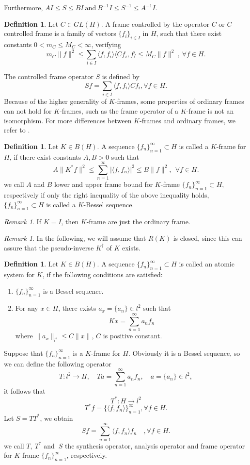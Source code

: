 \documentclass[11pt]{amsart}
\theoremstyle{definition}
\newtheorem{defn}[thm]{Definition}
\theoremstyle{remark}
\newtheorem{rem}[thm]{Remark}
\numberwithin{equation}{section}
\begin{document}
Furthermore, $AI\le S\le BI\ \text{and}\ B^{-1}I\le S^{-1}\le A^{-1}I$.
\begin{defn}
Let $C\in GL(H)$. A frame controlled by the operator $C$ or $C$-controlled frame is a family of vectors $\{f_i\}_{i\in I}$ in $H$, such that there exist constants $0<m_C\le M_C<\infty$, verifying
\[m_C\|f\|^2\le\sum_{i\in I}\langle f,f_i\rangle\langle Cf_i,f\rangle\le M_C\|f\|^2\ ,\ \forall f\in H.\]
\end{defn}
The controlled frame operator $S$ is defined by
\[Sf=\sum_{i\in I}\langle f,f_i\rangle Cf_i, \forall f\in H.\]
Because of the higher generality of $K$-frames, some properties of ordinary frames can not hold for $K$-frames, such as the frame operator of a $K$-frame is not an isomorphism. For more differences between $K$-frames and ordinary frames, we refer to \cite{12}.
\begin{defn}\label{def:kframe}
Let $K\in B(H)$.
A sequence $\{f_n\}_{n=1}^\infty\subset H$  is called a $K$-frame for $H$, if there exist constants $A, B>0$ such that
\begin{equation}\label{eq:kframe}
A\|K^*f\|^2\le \sum_{n=1}^{\infty}|\langle f,f_n\rangle|^2\le B\|f\|^2,~~\forall f\in H.
\end{equation}
we call $A$ and $ B$  lower and upper frame bound for $K$-frame $\{f_n\}_{n=1}^\infty\subset H$, respectively if only the right inequality of the above inequality holds, $\{f_n\}_{n=1}^\infty\subset H$ is called a $K$-Bessel sequence.
\end{defn}
\begin{rem}
If $K=I$, then $K$-frame are just the ordinary frame.
\end{rem}
\begin{rem}
In the following, we will assume that $R(K)$ is closed, since this can assure that the pseudo-inverse $K^\dagger$ of $K$ exists.
\end{rem}
\begin{defn}\label{def:atom}\cite{Gavruta}
Let $K\in B(H)$.
A sequence $\{f_n\}_{n=1}^\infty\subset H$  is called an atomic system for $K$, if the following conditions are satisfied:
\begin{enumerate}
\item $\{f_n\}_{n=1}^\infty$ is a Bessel sequence.
\item For any $x\in H$, there exists $a_x=\{a_n\}\in l^2$ such that
\[Kx=\sum_{n=1}^{\infty}a_nf_n\]
where $\|a_x\|_{l^2}\le C\|x\|$, $C$ is positive constant.
\end{enumerate}
\end{defn}
Suppose that $\{f_n\}_{n=1}^\infty$ is a $K$-frame for $H$. Obviously it is a Bessel sequence, so we can define the following operator
\[T:l^2\to H,\quad Ta=\sum_{n=1}^{\infty}a_nf_n,\quad a=\{a_n\}\in l^2,\]
it follows that
\[T^*:H\to l^2\]
\[T^*f=\{\langle f,f_n\rangle\}_{n=1}^\infty,\forall f\in H.\]
Let $S=TT^*$, we obtain
\[Sf=\sum_{n=1}^{\infty}\langle f,f_n\rangle f_n  \quad, \forall f\in H. \]
we call $T,\ T^*$ and $\ S$ the synthesis operator, analysis operator and frame operator for $K$-frame $\{f_n\}_{n=1}^\infty$, respectively.
\end{document}
